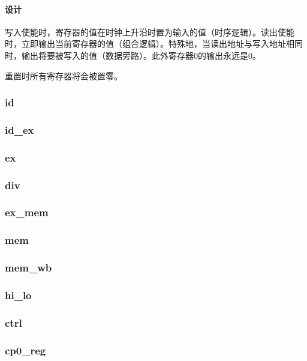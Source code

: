 \documentclass{article}
\begin{document}
\begin{spacing}{1.4}
\paragraph{设计}\mbox{}

写入使能时，寄存器的值在时钟上升沿时置为输入的值（时序逻辑）。读出使能时，立即输出当前寄存器的值（组合逻辑）。特殊地，当读出地址与写入地址相同时，输出将要被写入的值（数据旁路）。此外寄存器0的输出永远是0。

重置时所有寄存器将会被置零。

\subsubsection{id}
\subsubsection{id\_ex}
\subsubsection{ex}
\subsubsection{div}
\subsubsection{ex\_mem}
\subsubsection{mem}
\subsubsection{mem\_wb}
\subsubsection{hi\_lo}
\subsubsection{ctrl}
\subsubsection{cp0\_reg}


\end{spacing}
\end{document}
